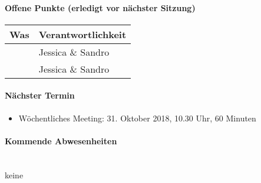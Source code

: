 \paragraph{Offene Punkte (erledigt vor nächster Sitzung)} \mbox{}
\begin{table}[H]
	\centering
	\begin{tabularx}{\textwidth}{X | p{4.5cm}}
		\rowcolor{gray!50}
		\textbf{Was} & \textbf{Verantwortlichkeit} \\
		\hline	
		 & Jessica \& Sandro  \\
		 & Jessica \& Sandro \\
	\end{tabularx}
	\label{tab:my-label}
\end{table}

\paragraph{Nächster Termin}
\begin{itemize}	
	\item Wöchentliches Meeting: 31. Oktober 2018, 10.30 Uhr, 60 Minuten
\end{itemize}

\paragraph{Kommende Abwesenheiten} \mbox{}\\
keine